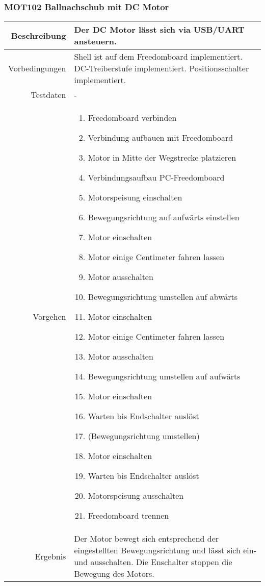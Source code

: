 \newpage
\subsubsection{MOT102 Ballnachschub mit DC Motor}
\begin{table}[h!]
	\renewcommand{\arraystretch}{1.5}
	\begin{tabular}{|r|p{14cm}|}
		\hline Beschreibung	& Der DC Motor lässt sich via USB/UART ansteuern. \\ 
		\hline Vorbedingungen	&
			Shell ist auf dem Freedomboard implementiert.
			DC-Treiberstufe implementiert. Positionsschalter implementiert. \\ 
		\hline Testdaten	& - \\ 
		\hline Vorgehen		& 
		\begin{enumerate}
			\item Freedomboard verbinden
			\item Verbindung aufbauen mit Freedomboard
			\item Motor in Mitte der Wegstrecke platzieren 
			\item Verbindungsaufbau PC-Freedomboard
			\item Motorspeisung einschalten
			\item Bewegungsrichtung auf aufwärts einstellen
			\item Motor einschalten
			\item Motor einige Centimeter fahren lassen
			\item Motor ausschalten
			\item Bewegungsrichtung umstellen auf abwärts
			\item Motor einschalten
			\item Motor einige Centimeter fahren lassen
			\item Motor ausschalten
			\item Bewegungsrichtung umstellen auf aufwärts
			\item Motor einschalten
			\item Warten bis Endschalter auslöst
			\item (Bewegungsrichtung umstellen)
			\item Motor einschalten
			\item Warten bis Endschalter auslöst
			\item Motorspeisung ausschalten
			\item Freedomboard trennen
		\end{enumerate} \\ 
		\hline Ergebnis 	&
			Der Motor bewegt sich entsprechend der eingestellten
			Bewegungsrichtung und lässt sich ein- und ausschalten.
			Die Enschalter stoppen die Bewegung des Motors. \\ 
		\hline 
	\end{tabular}
\end{table}

